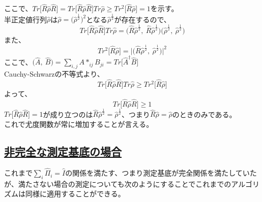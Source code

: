\documentclass[11pt,a4j,notitlepage]{jreport}
\begin{document}
	ここで、$Tr \big[ \hat{R} \hat{\rho} \hat{R} \big] = Tr \big[ \hat{R} \hat{\rho} \hat{R} \big] Tr \hat{\rho} \geq Tr^2 \big[ \hat{R} \hat{\rho} \big] = 1$を示す。\\
	半正定値行列$\hat{\rho}$は$\hat{\rho} = \big( \hat{\rho}^{\frac{1}{2}} \big)^2$となる$\hat{\rho}^{\frac{1}{2}}$が存在するので、
	\begin{equation}
		Tr \big[ \hat{R} \hat{\rho} \hat{R} \big] Tr \hat{\rho} = \Big( \hat{R} \hat{\rho}^{\frac{1}{2}},\ \hat{R} \hat{\rho}^{\frac{1}{2}} \Big) \Big( \hat{\rho}^{\frac{1}{2}},\ \hat{\rho}^{\frac{1}{2}} \Big)
	\end{equation}
	また、
	\begin{equation}
		Tr^2 \big[ \hat{R} \hat{\rho} \big] = \Big| \Big( \hat{R} \hat{\rho}^{\frac{1}{2}},\ \hat{\rho}^{\frac{1}{2}} \Big) \Big|^2
	\end{equation}
	ここで、$\big( \hat{A},\ \hat{B} \big) = \sum_{i,j} A*_{ij} B_{ji} = Tr \big[ \hat{A}^\dagger \hat{B} \big]$\\
	Cauchy-Schwarzの不等式より、
	\begin{equation}
		Tr \big[ \hat{R} \hat{\rho} \hat{R} \big] Tr \hat{\rho} \geq Tr^2 \big[ \hat{R} \hat{\rho} \big]
	\end{equation}
	よって、
	\begin{equation}
		Tr \big[ \hat{R} \hat{\rho} \hat{R} \big] \geq 1
	\end{equation}
	$Tr \big[ \hat{R} \hat{\rho} \hat{R} \big] = 1$が成り立つのは$\hat{R} \hat{\rho}^{\frac{1}{2}} = \hat{\rho}^{\frac{1}{2}}$、つまり$\hat{R} \hat{\rho} = \hat{\rho}$のときのみである。\\

	これで尤度関数が常に増加することが言える。

	\subsection*{\underline{非完全な測定基底の場合}}

	これまで$\sum_i \hat{\Pi}_i = \hat{I}$の関係を満たす、つまり測定基底が完全関係を満たしていたが、満たさない場合の測定についても次のようにすることでこれまでのアルゴリズムは同様に適用することができる。\\
\end{document}

